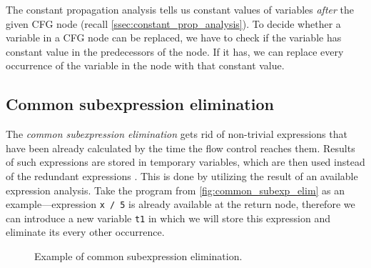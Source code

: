 \documentclass[thesis=M,english]{FITthesis}[2019/12/23]
\begin{document}
The constant propagation analysis tells us constant values of variables \emph{after} the given CFG node (recall \autoref{ssec:constant_prop_analysis}). To decide whether a variable in a CFG node can be replaced, we have to check if the variable has constant value in the predecessors of the node. If it has, we can replace every occurrence of the variable in the node with that constant value.

\subsection{Common subexpression elimination}
The \emph{common subexpression elimination} gets rid of non-trivial expressions that have been already calculated by the time the flow control reaches them. Results of such expressions are stored in temporary variables, which are then used instead of the redundant expressions \cite[Chap. 9.5.1]{dragonbook}. This is done by utilizing the result of an available expression analysis. Take the program from \autoref{fig:common_subexp_elim} as an example---expression \texttt{x / 5} is already available at the return node, therefore we can introduce a new variable \texttt{t1} in which we will store this expression and eliminate its every other occurrence.

\begin{figure}
	\centering
	\hspace{1em}
	\caption{Example of common subexpression elimination.}
	\label{fig:common_subexp_elim}
\end{figure}
\end{document}
